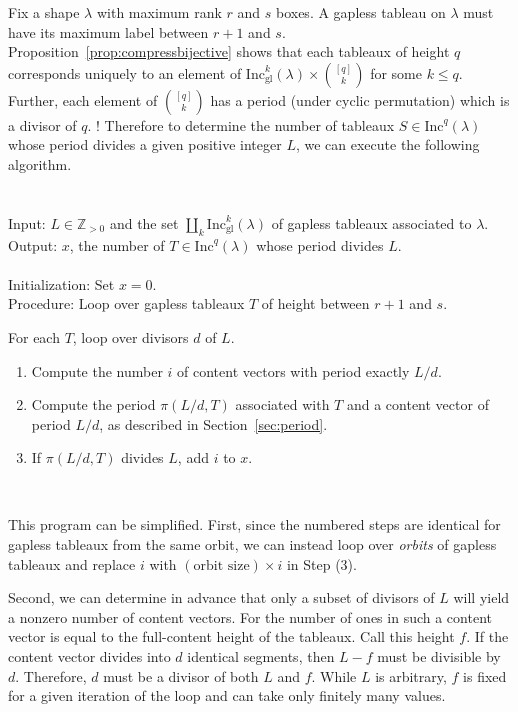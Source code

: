 \documentclass[12pt]{amsart}
\theoremstyle{definition}
\theoremstyle{remark}
\numberwithin{equation}{section}
\newcommand{\inc}{\ensuremath{\mathrm{Inc}}}
\newcommand{\incgl}{\inc_{\mathrm{gl}}}
\begin{document}
Fix a shape $\lambda$ with maximum rank $r$ and $s$ boxes.  A gapless tableau on $\lambda$ must have its maximum label between $r+1$ and $s$.  Proposition~\ref{prop:compressbijective} shows that each tableaux of height $q$ corresponds uniquely to an element of $\incgl^k(\lambda) \times \binom{[q]}{k}$ for some $k \leq q$. Further, each element of $\binom{[q]}{k}$ has a period (under cyclic permutation) which is a divisor of $q$. ! Therefore to determine the number of tableaux $S \in \inc^q(\lambda)$ whose period divides a given positive integer $L$, we can execute the following algorithm.
\-\ \\ \-\ \\ 
 \\ \noindent
\textsf{Input}:  $L \in \mathbb{Z}_{>0}$ and the set $\coprod_k \incgl^k(\lambda)$ of gapless tableaux associated to $\lambda$. \\ \noindent
\textsf{Output}: $x$, the number of $T \in \inc^q(\lambda)$ whose period divides $L$. \\  \-\ \\ 
\textsf{Initialization}: Set $x = 0$. \\
\textsf{Procedure}: Loop over gapless tableaux $T$ of height between $r+1$ and $s$.
\begin{arrowlist}
\item For each $T$, loop over divisors $d$ of $L$.
\begin{enumerate}
\item   Compute the number $i$ of content vectors with period exactly $L/d$. \item Compute the period $\pi(L/d,T)$ associated with $T$ and a content vector of period $L/d$, as described in Section~\ref{sec:period}. 
\item If $\pi(L/d,T)$ divides $L$, add $i$ to $x$.
\end{enumerate}
\end{arrowlist} \-\ 

This program can be simplified. First, since the numbered steps are identical for gapless tableaux from the same orbit, we can instead loop over {\it orbits} of gapless tableaux and replace $i$ with $(\text{orbit size}) \times i$ in Step (3).

Second, we can determine in advance that only a subset of divisors of $L$ will yield a nonzero number of content vectors. For the number of ones in such a content vector is equal to the full-content height of the tableaux. Call this height $f$. If the content vector divides into $d$ identical segments, then $L-f$ must be divisible by $d$. Therefore, $d$ must be a divisor of both $L$ and $f$. While $L$ is arbitrary, $f$ is fixed for a given iteration of the loop and can take only finitely many values. 
\end{document}
